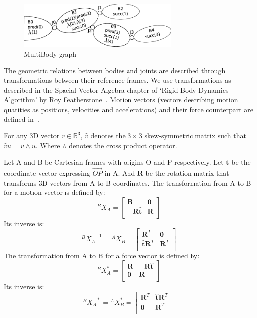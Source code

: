 \begin{figure}
  \centering
  \includegraphics[width=0.7\textwidth]{mbg.pdf}
  \caption{MultiBody graph}
\label{fig:mbg}
\end{figure}

The geometric relations between bodies and joints are described through transformations between their reference frames.
We use transformations as described in the Spacial Vector Algebra chapter of `Rigid Body Dynamics Algorithm' by Roy Featherstone~\cite{featherstone:book:2007}.
Motion vectors (vectors describing motion quatities as positions, velocities and accelerations) and their force counterpart are defined in~\cite{featherstone:book:2007}.

For any 3D vector $v\in\mathbb{R}^3$, $\hat{v}$ denotes the $3\times 3$ skew-symmetric matrix such that $\hat{v}u = v\wedge u$.
Where $\wedge$ denotes the cross product operator.

Let A and B be Cartesian frames with origins O and P respectively.
Let $\mathbf{t}$ be the coordinate vector expressing $\overrightarrow{OP}$ in A.
And $\mathbf{R}$ be the rotation matrix that transforms 3D vectors from A to B coordinates.
The transformation from A to B for a motion vector is defined by:
\begin{equation}
  {}^B X_A =
  \begin{bmatrix}
    \mathbf{R} & \mathbf{0} \\
    -\mathbf{R}\hat{\mathbf{t}} & \mathbf{R} \\
  \end{bmatrix}
\end{equation}
Its inverse is:
\begin{equation}
  {{}^B X_A}^{-1} = {}^A X_B =
  \begin{bmatrix}
    \mathbf{R}^T & \mathbf{0} \\
    \hat{\mathbf{t}}\mathbf{R}^T & \mathbf{R}^T \\
  \end{bmatrix}
\end{equation}
The transformation from A to B for a force vector is defined by:
\begin{equation}
  {}^B X_A^* =
  \begin{bmatrix}
    \mathbf{R} & -\mathbf{R}\hat{\mathbf{t}} \\
    \mathbf{0} & \mathbf{R} \\
  \end{bmatrix}
\end{equation}
Its inverse is:
\begin{equation}
  {}^B X_A^{-*} = {}^A X_B^* =
  \begin{bmatrix}
    \mathbf{R}^T & \hat{\mathbf{t}}\mathbf{R}^T \\
    \mathbf{0} & \mathbf{R}^T \\
  \end{bmatrix}
\end{equation}

